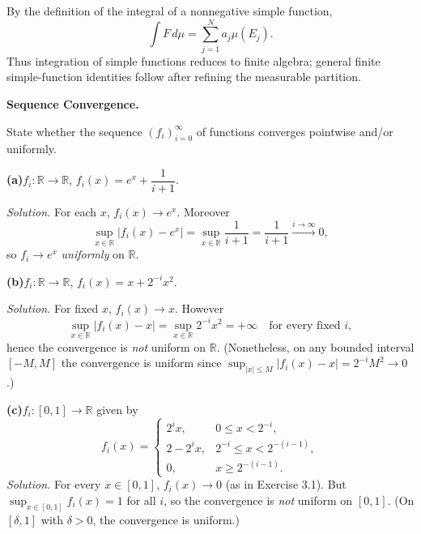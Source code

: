 \begin{solution}
By the definition of the integral of a nonnegative simple function,
\[
\boxed{\int F\,d\mu=\sum_{j=1}^N a_j\mu(E_j).}
\]
Thus integration of simple functions reduces to finite algebra; general finite simple-function identities follow after refining the measurable partition.
\end{solution}


\begin{problem}[CP-II-0294]
\label{prob:cp-ii-0294}
\textbf{Sequence Convergence.}

\hspace*{1.5em}State whether the sequence $(f_i)_{i=0}^\infty$ of functions converges pointwise and/or uniformly.

\renewcommand\labelenumi{(\alph{enumi})}

\par\smallskip\noindent\textbf{(a)}\quad $f_i:\mathbb{R}\to\mathbb{R}$, \; $f_i(x)=e^{x}+\dfrac{1}{i+1}$.

\textit{Solution.} For each $x$, $f_i(x)\to e^x$. Moreover
\[
\sup_{x\in\mathbb{R}} |f_i(x)-e^x|=\sup_{x\in\mathbb{R}}\frac{1}{i+1}=\frac{1}{i+1}\xrightarrow{i\to\infty}0,
\]
so $f_i\to e^x$ \emph{uniformly} on $\mathbb{R}$.

\par\smallskip\noindent\textbf{(b)}\quad $f_i:\mathbb{R}\to\mathbb{R}$, \; $f_i(x)=x+2^{-i}x^2$.

\textit{Solution.} For fixed $x$, $f_i(x)\to x$. However
\[
\sup_{x\in\mathbb{R}} |f_i(x)-x|=\sup_{x\in\mathbb{R}} 2^{-i}x^2=+\infty \quad \text{for every fixed } i,
\]
hence the convergence is \emph{not} uniform on $\mathbb{R}$.
(Nonetheless, on any bounded interval $[-M,M]$ the convergence is uniform since
$\sup_{|x|\le M} |f_i(x)-x|=2^{-i}M^2\to 0$.)

\par\smallskip\noindent\textbf{(c)}\quad $f_i:[0,1]\to\mathbb{R}$ given by
\[
f_i(x)=
\begin{cases}
2^i x, & 0\le x<2^{-i},\\[2pt]
2-2^i x, & 2^{-i}\le x<2^{-(i-1)},\\[2pt]
0, & x\ge 2^{-(i-1)}.
\end{cases}
\]
\textit{Solution.} For every $x\in[0,1]$, $f_i(x)\to 0$ (as in Exercise 3.1). But
$\sup_{x\in[0,1]} f_i(x)=1$ for all $i$, so the convergence is \emph{not} uniform on $[0,1]$.
(On $[\delta,1]$ with $\delta>0$, the convergence is uniform.)
\end{problem}


